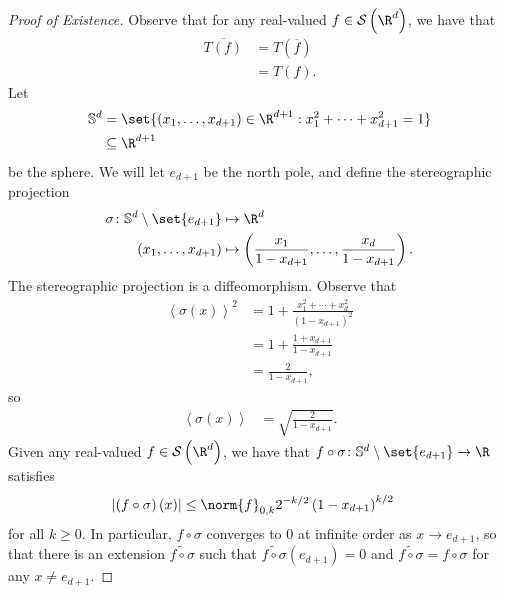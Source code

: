 \documentclass[10pt]{mypackage}
\begin{document}
\begin{proof}[Proof of Existence]
  Observe that for any real-valued $f\in \mathcal{S}\left( \R^d \right)$, we have that
  \begin{align*}
    \overline{T\left( f \right)} &= T\left( \overline{f} \right)\\
                                 &= T\left( f \right).
  \end{align*}
  Let
  \begin{align*}
    \mathbb{S}^d &= \set{\left( x_1,\dots,x_{d+1} \right)\in \R^{d+1} : x_1^2 + \cdots + x_{d+1}^2 = 1}\\
                 &\subseteq \R^{d+1}
  \end{align*}
  be the sphere. We will let $e_{d+1}$ be the north pole, and define the stereographic projection
  \begin{align*}
    \sigma\colon \mathbb{S}^d\setminus \set{e_{d+1}} &\mapsto \R^d\\
    \left( x_1,\dots,x_{d+1} \right) &\mapsto \left( \frac{x_1}{1-x_{d+1}},\dots,\frac{x_d}{1-x_{d+1}} \right).
  \end{align*}
  The stereographic projection is a diffeomorphism. Observe that
  \begin{align*}
    \left\langle \sigma(x) \right\rangle^2 &= 1 + \frac{x_1^2 + \cdots + x_d^2}{\left( 1-x_{d+1} \right)^2}\\
                                           &= 1 + \frac{1 + x_{d+1}}{1 - x_{d+1}}\\
                                           &= \frac{2}{1-x_{d+1}},
  \end{align*}
  so
  \begin{align*}
    \left\langle \sigma(x) \right\rangle &= \sqrt{\frac{2}{1-x_{d+1}}}.
  \end{align*}
  Given any real-valued $f\in \mathcal{S}\left( \R^d \right)$, we have that $f\circ\sigma\colon \mathbb{S}^d\setminus \set{e_{d+1}}\to \R$ satisfies
  \begin{align*}
    \left\vert \left( f\circ\sigma \right)(x) \right\vert &\leq \norm{f}_{0,k} 2^{-k/2} \left( 1-x_{d+1} \right)^{k/2}
  \end{align*}
  for all $k \geq 0$. In particular, $f\circ \sigma$ converges to $0$ at infinite order as $x\to e_{d+1}$, so that there is an extension $ \widetilde{f\circ \sigma} $ such that $ \widetilde{f\circ \sigma}\left( e_{d+1} \right) = 0 $ and $ \widetilde{f\circ\sigma} = f\circ\sigma $ for any $x\neq e_{d+1}$.


\end{proof}
\end{document}
